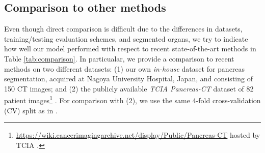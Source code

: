\documentclass[authoryear]{elsarticle}
\begin{document}
\subsection{Comparison to other methods} 
Even though direct comparison is difficult due to the differences in datasets, training/testing evaluation schemes, and segmented organs, we try to indicate how well our model performed with respect to recent state-of-the-art methods in Table \ref{tab:comparison}. In particualar, we provide a comparison to recent methods on two different datasets: (1) our own \textit{in-house} dataset for pancreas segmentation, acquired at Nagoya University Hospital, Japan, and consisting of 150 CT images; and (2) the publicly available \textit{TCIA Pancreas-CT} dataset of 82 patient images\footnote{\url{https://wiki.cancerimagingarchive.net/display/Public/Pancreas-CT} \citep{tciaPancreasCT} hosted by TCIA \citep{clark2013cancer}.} \citep{tciaPancreasCT}. For comparison with (2), we use the same 4-fold cross-validation (CV) split as in \citep{roth2015deeporgan,roth2017spatial}. 
\end{document}
